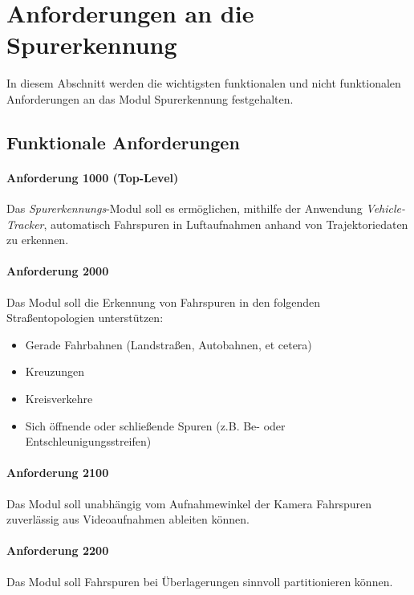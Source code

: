 \section{Anforderungen an die Spurerkennung}
\label{sec:requirements}

In diesem Abschnitt werden die wichtigsten funktionalen und nicht funktionalen Anforderungen
an das Modul Spurerkennung festgehalten.

\subsection{Funktionale Anforderungen}

\paragraph{Anforderung 1000 (Top-Level)}
Das \textit{Spurerkennungs}-Modul soll es ermöglichen, mithilfe der Anwendung \textit{Vehicle-Tracker},
automatisch Fahrspuren in Luftaufnahmen anhand von Trajektoriedaten zu erkennen.

\paragraph{Anforderung 2000}
Das Modul soll die Erkennung von Fahrspuren in den folgenden Straßentopologien unterstützen:

\begin{itemize}
    \item Gerade Fahrbahnen (Landstraßen, Autobahnen, et cetera)
    \item Kreuzungen
    \item Kreisverkehre
    \item Sich öffnende oder schließende Spuren (z.B. Be- oder Entschleunigungsstreifen)
\end{itemize}

\paragraph{Anforderung 2100}
Das Modul soll unabhängig vom Aufnahmewinkel der Kamera Fahrspuren zuverlässig aus Videoaufnahmen ableiten können.

\paragraph{Anforderung 2200}
Das Modul soll Fahrspuren bei Überlagerungen sinnvoll partitionieren können.



